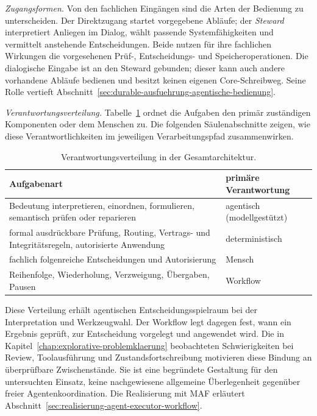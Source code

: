 \emph{Zugangsformen.} Von den fachlichen Eingängen sind die
Arten der Bedienung zu unterscheiden. Der Direktzugang startet
vorgegebene Abläufe; der \emph{Steward} interpretiert Anliegen im
Dialog, wählt passende Systemfähigkeiten und vermittelt anstehende
Entscheidungen. Beide nutzen für ihre fachlichen Wirkungen die
vorgesehenen Prüf-, Entscheidungs- und Speicheroperationen. Die
dialogische Eingabe ist an den Steward gebunden; dieser kann auch
andere vorhandene Abläufe bedienen und besitzt keinen eigenen
Core-Schreibweg. Seine Rolle vertieft
Abschnitt~\ref{sec:durable-ausfuehrung-agentische-bedienung}.

\emph{Verantwortungsverteilung.} Tabelle~\ref{tab:verantwortung}
ordnet die Aufgaben den primär zuständigen Komponenten oder dem
Menschen zu. Die folgenden Säulenabschnitte zeigen, wie diese
Verantwortlichkeiten im jeweiligen Verarbeitungspfad zusammenwirken.

\begin{table}[htbp]
  \centering
  \small
  \begin{tabular}{p{}p{}}
    \hline
    \textbf{Aufgabenart} & \textbf{primäre Verantwortung} \\
    \hline
    Bedeutung interpretieren, einordnen, formulieren, semantisch
      prüfen oder reparieren & agentisch (modellgestützt) \\
    formal ausdrückbare Prüfung, Routing, Vertrags- und
      Integritätsregeln, autorisierte Anwendung & deterministisch \\
    fachlich folgenreiche Entscheidungen und Autorisierung & Mensch \\
    Reihenfolge, Wiederholung, Verzweigung, Übergaben, Pausen &
      Workflow \\
    \hline
  \end{tabular}
  \caption{Verantwortungsverteilung in der Gesamtarchitektur.}
  \label{tab:verantwortung}
\end{table}

Diese Verteilung erhält agentischen Entscheidungsspielraum bei der
Interpretation und Werkzeugwahl. Der Workflow legt dagegen fest,
wann ein Ergebnis geprüft, zur Entscheidung vorgelegt und angewendet
wird. Die in Kapitel~\ref{chap:explorative-problemklaerung}
beobachteten Schwierigkeiten bei Review, Toolausführung und
Zustandsfortschreibung motivieren diese Bindung an überprüfbare
Zwischenstände. Sie ist eine begründete Gestaltung für den
untersuchten Einsatz, keine nachgewiesene allgemeine Überlegenheit
gegenüber freier Agentenkoordination. Die Realisierung mit MAF
erläutert Abschnitt~\ref{sec:realisierung-agent-executor-workflow}.

